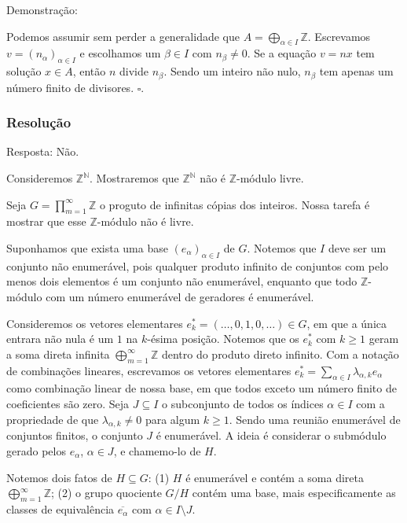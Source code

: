\documentclass[10pt,a4paper]{article}
\begin{document}
\medskip
\noindent
Demonstração:

\noindent
Podemos assumir sem perder a generalidade que $A=\bigoplus_{\alpha\in I}\mathbb{Z}$. Escrevamos $v=(n_\alpha)_{\alpha\in I}$ e escolhamos um $\beta\in I$ com $n_\beta\neq 0$. Se a equação $v=nx$ tem solução $x\in A$, então $n$ divide $n_\beta$. Sendo um inteiro não nulo, $n_\beta$ tem apenas um número finito de divisores. $\square$.

\subsubsection*{Resolução}

Resposta: Não.

\medskip
\noindent
Consideremos $\mathbb{Z}^\mathbb{N}$. Mostraremos que $\mathbb{Z}^\mathbb{N}$ não é $\mathbb{Z}$-módulo livre.

\medskip
\noindent
Seja $G=\prod_{m=1}^\infty\mathbb{Z}$ o proguto de infinitas cópias dos inteiros. Nossa tarefa é mostrar que esse $\mathbb{Z}$-módulo não é livre.

\medskip
\noindent
Suponhamos que exista uma base $(e_\alpha)_{\alpha\in I}$ de $G$. Notemos que $I$ deve ser um conjunto não enumerável, pois qualquer produto infinito de conjuntos com pelo menos dois elementos é um conjunto não enumerável, enquanto que todo $\mathbb{Z}$-módulo com um número enumerável de geradores é enumerável.

\medskip
\noindent
Consideremos os vetores elementares $e^*_k=(\dots,0,1,0,\dots)\in G$, em que a única entrara não nula é um $1$ na $k$-ésima posição. Notemos que os $e^*_k$ com $k\geq 1$ geram a soma direta infinita $\bigoplus_{m=1}^\infty\mathbb{Z}$ dentro do produto direto infinito. Com a notação de combinações lineares, escrevamos os vetores elementares $e^*_k=\sum_{\alpha\in I}\lambda_{\alpha,k}e_\alpha$ como combinação linear de nossa base, em que todos exceto um número finito de coeficientes são zero. Seja $J\subseteq I$ o subconjunto de todos os índices $\alpha\in I$ com a propriedade de que $\lambda_{\alpha,k}\neq 0$ para algum $k\geq 1$. Sendo uma reunião enumerável de conjuntos finitos, o conjunto $J$ é enumerável. A ideia é considerar o submódulo gerado pelos $e_\alpha$, $\alpha\in J$, e chamemo-lo de $H$.

\medskip
\noindent
Notemos dois fatos de $H\subseteq G$: (1) $H$ é enumerável e contém a soma direta $\bigoplus_{m=1}^\infty\mathbb{Z}$; (2) o grupo quociente $G/H$ contém uma base, mais especificamente as classes de equivalência $\overline{e_\alpha}$ com $\alpha\in I\setminus J$.
\end{document}
